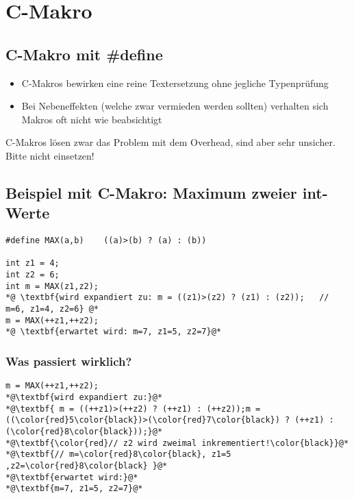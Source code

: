 \section{C-Makro}

\subsection{C-Makro mit {\#define}}
\begin{itemize}
	\item C-Makros bewirken eine reine Textersetzung ohne jegliche Typenprüfung
	\item Bei Nebeneffekten (welche zwar vermieden werden sollten) verhalten sich Makros oft nicht wie beabsichtigt
\end{itemize}
\begin{achtung}
C-Makros lösen zwar das Problem mit dem Overhead, sind aber sehr unsicher. Bitte nicht einsetzen!
\end{achtung}

\subsection{Beispiel mit C-Makro: Maximum zweier int-Werte}
\begin{minipage}{0.6\linewidth}
\vspace{-\baselineskip}
\begin{lstlisting}
#define MAX(a,b)	((a)>(b) ? (a) : (b))

int z1 = 4;
int z2 = 6;
int m = MAX(z1,z2);
*@ \textbf{wird expandiert zu: m = ((z1)>(z2) ? (z1) : (z2));	// m=6, z1=4, z2=6} @*
m = MAX(++z1,++z2);
*@ \textbf{erwartet wird: m=7, z1=5, z2=7}@*
\end{lstlisting}
\end{minipage}

\subsubsection{Was passiert wirklich?}
\begin{minipage}{0.6\linewidth}
\vspace{-\baselineskip}
\begin{lstlisting}
m = MAX(++z1,++z2);
*@\textbf{wird expandiert zu:}@*
*@\textbf{ m = ((++z1)>(++z2) ? (++z1) : (++z2));m = ((\color{red}5\color{black})>(\color{red}7\color{black}) ? (++z1) : (\color{red}8\color{black}));}@*
*@\textbf{\color{red}// z2 wird zweimal inkrementiert!\color{black}}@*
*@\textbf{// m=\color{red}8\color{black}, z1=5 ,z2=\color{red}8\color{black} }@*
*@\textbf{erwartet wird:}@*
*@\textbf{m=7, z1=5, z2=7}@*
\end{lstlisting}
\end{minipage}


